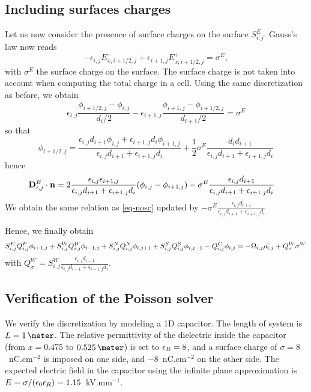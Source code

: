     \subsection{Including surfaces charges}
    Let us now consider the presence of surface charges on the surface $S^E_{i,j}$.
    Gauss's law now reads
    \begin{equation} \label{eq-gausslawsc}
      -\epsilon_{i,j}E_{x, i+1/2,j}^- + \epsilon_{i+1,j}E_{x, i+1/2,j}^+ =\sigma^E,
    \end{equation}
    with $\sigma^E$ the surface charge on the surface.
    The surface charge is not taken into account when computing the total charge in a cell.
    Using the same discretization as before, we obtain
    \begin{equation}
    \epsilon_{i,j} \frac{\phi_{i+1/2,j} - \phi_{i,j}}{d_i/2} - \epsilon_{i+1,j} \frac{\phi_{i+1,j} - \phi_{i+1/2,j}}{d_{i+1}/2} = \sigma^E
    \end{equation}
    so that
    \begin{equation}
      \label{eq-phidemi}
    \phi_{i+1/2,j} = \frac{\epsilon_{i,j} d_{i+1} \phi_{i,j} + \epsilon_{i+1,j} d_{i} \phi_{i+1,j} }{\epsilon_{i,j} d_{i+1} + \epsilon_{i+1,j} d_{i} } + \frac{1}{2}\sigma^E \frac{d_i d_{i+1}}{\epsilon_{i,j} d_{i+1} + \epsilon_{i+1,j} d_{i}}
    \end{equation}
    hence
    \begin{align*}
    {\mathbf D}^E_{i,j} \cdot {\mathbf n} &= 2\frac{\epsilon_{i,j}\epsilon_{i+1,j}}{\epsilon_{i,j}d_{i+1} + \epsilon_{i+1,j} d_i} (\phi_{i,j}-\phi_{i+1,j}) - \sigma^E \frac{\epsilon_{i,j}d_{i+1}}{\epsilon_{i,j}d_{i+1}+\epsilon_{i+1,j}d_{i}}
    \end{align*}
    We obtain the same relation as \cref{eq-nosc} updated by $- \sigma^E \frac{\epsilon_{i,j}d_{i+1}}{\epsilon_{i,j}d_{i+1}+\epsilon_{i+1,j}d_{i}}$

    Hence, we finally obtain
    \begin{equation}
    S^E_{i,j} Q^E_{i,j} \phi_{i+1,j} + S^W_{i,j} Q^W_{i,j} \phi_{i-1,j} + S^N_{i,j} Q^N_{i,j} \phi_{i,j+1} + S^S_{i,j} Q^S_{i,j} \phi_{i,j-1} - Q^C_{i,j} \phi_{i,j} = - \Omega_{i,j} \bar{\rho_{i,j}} + Q^W_{\sigma} \sigma^W
    \end{equation}
    with $Q^W_{\sigma} =  S^W_{i,j} \frac{\epsilon_{i,j}d_{i-1}}{\epsilon_{i,j}d_{i-1}+\epsilon_{i-1,j}d_{i}}$.



  \subsection{Verification of the Poisson solver} \label{subsec-poisson_validation}
    We verify the discretization by modeling a \ac{1D} capacitor.
    The length of system is $L=1\,\meter$.
    The relative permittivity of the dielectric inside the capacitor (from $x=0.475$ to $0.525\,\meter$) is set to $\epsilon_{R} = 8$, and a surface charge of  $\sigma = 8$~nC.cm$^{-2}$ is imposed on one side, and $-8$~nC.cm$^{-2}$ on the other side.
    The expected electric field in the capacitor using the infinite plane approximation is $E = \sigma/(\epsilon_0\epsilon_{R}) = 1.15$~kV.mm$^{-1}$.

